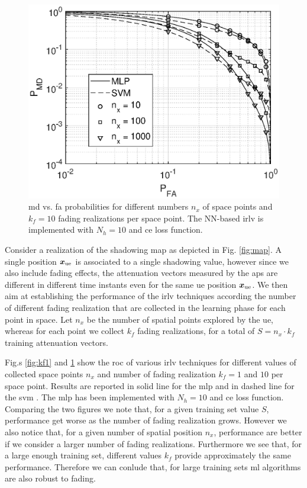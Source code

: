 \documentclass[draftcls,onecolumn,12pt]{IEEEtran}
\begin{document}
\begin{figure}[t]
    \centering
    \includegraphics[width=0.6\columnwidth]{res_avg_nTrain_kf10.eps}
    \caption{\ac{md} vs. \ac{fa} probabilities for different numbers $n_x$ of space points and $k_f=10$ fading realizations per space point. The NN-based \ac{irlv} is implemented with $N_h = 10$ and \ac{ce} loss function.}
    \label{fig:kf10}
\end{figure}

Consider a realization of the shadowing map as depicted in Fig. \ref{fig:map}. A single position $\bm{x}_{\rm ue}$ is associated to a single shadowing value, however since we also include fading effects, the attenuation vectors measured by the \acp{ap} are different in different time instants even for the same \ac{ue} position $\bm{x}_{\rm ue}$. We then aim at establishing the performance of the \ac{irlv} techniques according the number of different fading realization that are collected in the learning phase for each point in space. Let $n_x$ be the number of spatial points explored by the \ac{ue}, whereas for each point we collect $k_f$ fading realizations, for a total of $S = n_x \cdot k_f$ training attenuation vectors. 

Fig.s \ref{fig:kf1} and \ref{fig:kf10} show the \ac{roc} of various \ac{irlv} techniques for different values of collected space points $n_x$ and number of fading realization $k_f = 1$ and $10$ per space point. Results are reported in solid line for the \ac{mlp} and in dashed line for the \ac{svm} . The \ac{mlp} has been implemented with $N_h=10$ and \ac{ce} loss function.  Comparing the two figures we note that, for a given training set value $S$, performance get worse as the number of fading realization grows. However we also notice that, for a given number of spatial position $n_x$, performance are better if we consider a larger number of fading realizations. Furthermore we see that, for a large enough training set,  different values $k_f$ provide approximately the same performance.  Therefore we can conlude that, for large training sets \ac{ml} algorithms are also robust to fading. 
\end{document}
